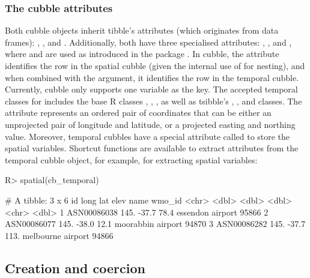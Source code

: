 \documentclass[
  shortnames]{jss}
\begin{document}
\hypertarget{the-cubble-attributes}{%
\subsubsection{The cubble attributes}\label{the-cubble-attributes}}

Both cubble objects inherit tibble's attributes (which originates from data frames): , , and . Additionally, both have three specialised attributes: , , and , where  and  are used as introduced in the  package \citep{tsibble}. In cubble, the  attribute identifies the row in the spatial cubble (given the internal use of  for nesting), and when combined with the  argument, it identifies the row in the temporal cubble. Currently, cubble only supports one variable as the key. The accepted temporal classes for  includes the base R classes , , , as well as tsibble's , , and  classes. The  attribute represents an ordered pair of coordinates that can be either an unprojected pair of longitude and latitude, or a projected easting and northing value. Moreover, temporal cubbles have a special attribute called  to store the spatial variables. Shortcut functions are available to extract attributes from the temporal cubble object, for example,  for extracting spatial variables:

\begin{CodeChunk}
\begin{CodeInput}
R> spatial(cb_temporal)
\end{CodeInput}
\begin{CodeOutput}
# A tibble: 3 x 6
  id           long   lat  elev name              wmo_id
  <chr>       <dbl> <dbl> <dbl> <chr>              <dbl>
1 ASN00086038  145. -37.7  78.4 essendon airport   95866
2 ASN00086077  145. -38.0  12.1 moorabbin airport  94870
3 ASN00086282  145. -37.7 113.  melbourne airport  94866
\end{CodeOutput}
\end{CodeChunk}

\hypertarget{create}{%
\subsection{Creation and coercion}\label{create}}
\end{document}
